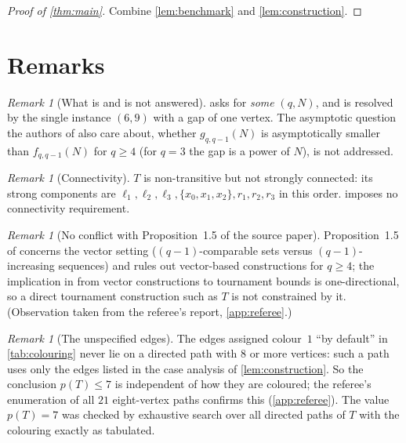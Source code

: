\documentclass[11pt,a4paper]{article}
\theoremstyle{plain}
\theoremstyle{definition}
\theoremstyle{remark}
\newtheorem{remark}[theorem]{Remark}
\newcommand{\pth}{p}
\newcommand{\lv}{\ell}
\begin{document}
\begin{proof}[Proof of \cref{thm:main}]
Combine \cref{lem:benchmark} and \cref{lem:construction}.
\end{proof}

\section{Remarks}

\begin{remark}[What is and is not answered]
 asks for \emph{some} $(q,N)$, and is resolved by the single instance $(6,9)$ with a gap of one vertex. The asymptotic question the authors of \cite{FSW25} also care about, whether $g_{q,q-1}(N)$ is asymptotically smaller than $f_{q,q-1}(N)$ for $q\ge4$ (for $q=3$ the gap is a power of $N$), is not addressed.
\end{remark}

\begin{remark}[Connectivity]
$T$ is non-transitive but not strongly connected: its strong components are $\lv_1,\lv_2,\lv_3,\{x_0,x_1,x_2\},r_1,r_2,r_3$ in this order.  imposes no connectivity requirement.
\end{remark}

\begin{remark}[No conflict with Proposition~1.5 of the source paper]
Proposition~1.5 of \cite{FSW25} concerns the vector setting ($(q-1)$-comparable sets versus $(q-1)$-increasing sequences) and rules out vector-based constructions for $q\ge4$; the implication in \cite{FSW25} from vector constructions to tournament bounds is one-directional, so a direct tournament construction such as $T$ is not constrained by it. (Observation taken from the referee's report, \cref{app:referee}.)
\end{remark}

\begin{remark}[The unspecified edges]
The edges assigned colour~$1$ ``by default'' in \cref{tab:colouring} never lie on a directed path with $8$ or more vertices: such a path uses only the edges listed in the case analysis of \cref{lem:construction}. So the conclusion $\pth(T)\le7$ is independent of how they are coloured; the referee's enumeration of all $21$ eight-vertex paths confirms this (\cref{app:referee}). The value $\pth(T)=7$ was checked by exhaustive search over all directed paths of $T$ with the colouring exactly as tabulated.
\end{remark}
\end{document}
